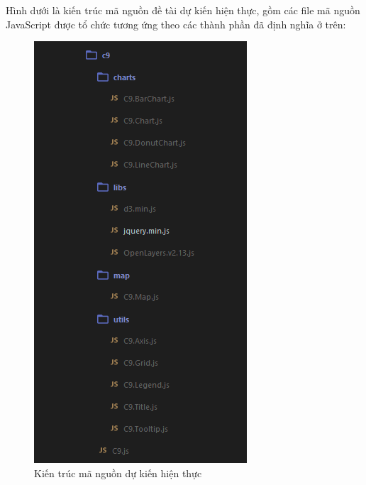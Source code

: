 \documentclass[12pt,a4paper,oneside]{article}
\begin{document}
Hình dưới là kiến trúc mã nguồn đề tài dự kiến hiện thực, gồm các file mã nguồn JavaScript được tổ chức tương ứng theo các thành phần đã định nghĩa ở trên:


\begin{figure}[htp]
	\begin{center}
    \includegraphics[scale=.8]{image/api_model}
    \caption{Kiến trúc mã nguồn dự kiến hiện thực}
    \label{refhinh20}
    \end{center}
\end{figure}
\end{document}
